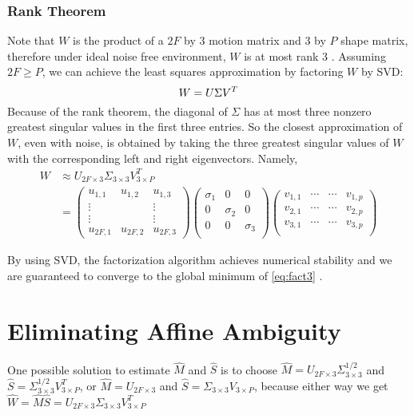 \subsubsection{Rank Theorem}
Note that $W$ is the product of a $2F$ by $3$ motion matrix and
$3$ by $P$ shape matrix, therefore under ideal noise free environment,
$W$ is at most rank 3 \cite{Tomasi}. Assuming $2F \ge P$, we can
achieve the least squares approximation by factoring $W$ by SVD: $$W = U\Sigma V^T\\$$
Because of the rank theorem, the diagonal of $\Sigma$ has at most three nonzero
greatest singular values in the first three entries. So the closest approximation of $W$, even with noise,
is obtained by taking the three greatest singular values of $W$ with
the corresponding left and right eigenvectors. Namely,
\begin{align*}
W&\approx U_{2F\times 3}\Sigma_{3 \times 3} V_{3\times P}^T\\
&= \begin{pmatrix}
  u_{1,1} & u_{1,2} & u_{1,3} \\ \vdots & & \vdots
\\ \vdots & & \vdots
\\   u_{2F,1} & u_{2F,2} & u_{2F,3} 
\end{pmatrix}
\begin{pmatrix}
  \sigma_1 & 0 & 0 \\
  0 & \sigma_2 & 0 \\
  0 & 0 & \sigma_3 \\
\end{pmatrix}
\begin{pmatrix}
  v_{1,1} &  \cdots &\cdots & v_{1,p}\\
  v_{2,1} &  \cdots &\cdots & v_{2,p}\\
  v_{3,1} &  \cdots &\cdots & v_{3,p}\\
\end{pmatrix}
\end{align*}

By using SVD, the factorization algorithm achieves numerical stability
and we are guaranteed to converge to the global minimum of
\eqref{eq:fact3} \cite{Morris}. 

\section{Eliminating Affine Ambiguity}

One possible solution to estimate $\hat M$ and $\hat S$ is to choose
$\hat M = U_{2F\times 3}\Sigma_{3 \times 3}^{1/2}$ and $\hat S =\Sigma_{3 \times 3}^{1/2}V_{3\times P}^T$, or
$\hat M =U_{2F\times 3}$ and $\hat S=\Sigma_{3 \times 3}V_{3\times
  P}$, because either way we get $\hat W = \hat M \hat S = U_{2F\times 3}\Sigma_{3 \times 3} V_{3\times P}^T$

